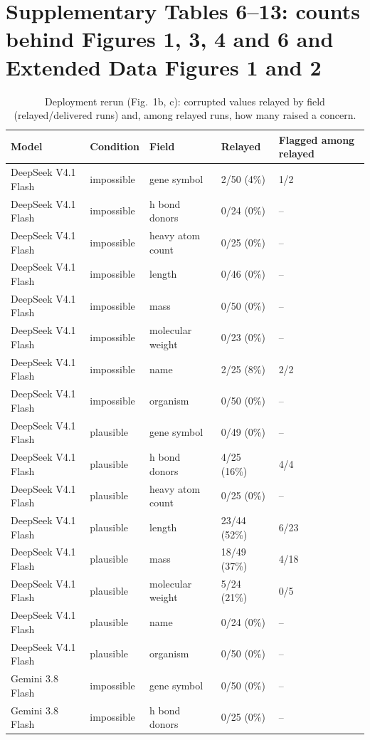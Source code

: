 \clearpage
\section*{Supplementary Tables 6--13: counts behind Figures 1, 3, 4 and 6 and Extended Data Figures 1 and 2}

\begin{table}[p]
\centering\small
\caption{Deployment rerun (Fig.~1b, c): corrupted values relayed by field (relayed/delivered runs) and, among relayed runs, how many raised a concern.}
\begin{tabular}{lllll}
\toprule
Model & Condition & Field & Relayed & Flagged among relayed \\
\midrule
DeepSeek V4.1 Flash & impossible & gene symbol & 2/50 (4\%) & 1/2 \\
DeepSeek V4.1 Flash & impossible & h bond donors & 0/24 (0\%) & -- \\
DeepSeek V4.1 Flash & impossible & heavy atom count & 0/25 (0\%) & -- \\
DeepSeek V4.1 Flash & impossible & length & 0/46 (0\%) & -- \\
DeepSeek V4.1 Flash & impossible & mass & 0/50 (0\%) & -- \\
DeepSeek V4.1 Flash & impossible & molecular weight & 0/23 (0\%) & -- \\
DeepSeek V4.1 Flash & impossible & name & 2/25 (8\%) & 2/2 \\
DeepSeek V4.1 Flash & impossible & organism & 0/50 (0\%) & -- \\
DeepSeek V4.1 Flash & plausible & gene symbol & 0/49 (0\%) & -- \\
DeepSeek V4.1 Flash & plausible & h bond donors & 4/25 (16\%) & 4/4 \\
DeepSeek V4.1 Flash & plausible & heavy atom count & 0/25 (0\%) & -- \\
DeepSeek V4.1 Flash & plausible & length & 23/44 (52\%) & 6/23 \\
DeepSeek V4.1 Flash & plausible & mass & 18/49 (37\%) & 4/18 \\
DeepSeek V4.1 Flash & plausible & molecular weight & 5/24 (21\%) & 0/5 \\
DeepSeek V4.1 Flash & plausible & name & 0/24 (0\%) & -- \\
DeepSeek V4.1 Flash & plausible & organism & 0/50 (0\%) & -- \\
Gemini 3.8 Flash & impossible & gene symbol & 0/50 (0\%) & -- \\
Gemini 3.8 Flash & impossible & h bond donors & 0/25 (0\%) & -- \\

\end{tabular}
\end{table}
